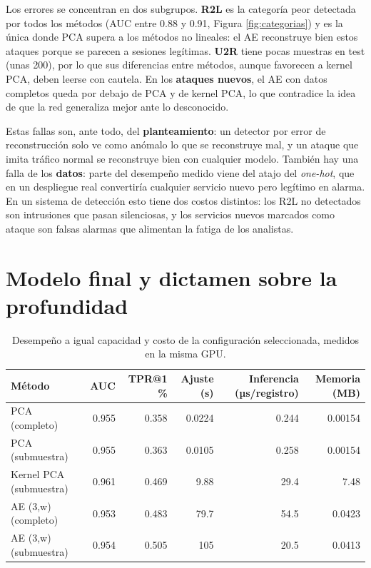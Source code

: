 \documentclass[
  11pt,
]{article}
\begin{document}
Los errores se concentran en dos subgrupos. \textbf{R2L} es la categoría peor detectada por todos los métodos
(AUC entre 0.88 y 0.91, Figura \ref{fig:categorias}) y es la única donde PCA supera a los métodos no
lineales: el AE reconstruye bien estos ataques porque se parecen a sesiones legítimas. \textbf{U2R} tiene pocas
muestras en test (unas 200), por lo que sus diferencias entre métodos, aunque favorecen a kernel PCA,
deben leerse con cautela. En los \textbf{ataques nuevos}, el AE con datos completos queda por debajo de PCA y
de kernel PCA, lo que contradice la idea de que la red generaliza mejor ante lo desconocido.

Estas fallas son, ante todo, del \textbf{planteamiento}: un detector por error de reconstrucción solo ve como
anómalo lo que se reconstruye mal, y un ataque que imita tráfico normal se reconstruye bien con
cualquier modelo. También hay una falla de los \textbf{datos}: parte del desempeño medido viene del atajo del
\emph{one-hot}, que en un despliegue real convertiría cualquier servicio nuevo pero legítimo en alarma. En un
sistema de detección esto tiene dos costos distintos: los R2L no detectados son intrusiones que pasan
silenciosas, y los servicios nuevos marcados como ataque son falsas alarmas que alimentan la fatiga de
los analistas.

\hypertarget{sec:dictamen}{%
\section{Modelo final y dictamen sobre la profundidad}\label{sec:dictamen}}

\begin{table}[!h]
\centering
\caption{\label{tab:costo}Desempeño a igual capacidad y costo de la configuración seleccionada, medidos en la misma GPU.}
\centering
\fontsize{8}{10}\selectfont
\begin{tabular}[t]{lrrrrr}
\toprule
Método & AUC & TPR@1 \% & Ajuste (s) & Inferencia (µs/registro) & Memoria (MB)\\
\midrule
PCA (completo) & 0.955 & 0.358 & 0.0224 & 0.244 & 0.00154\\
PCA (submuestra) & 0.955 & 0.363 & 0.0105 & 0.258 & 0.00154\\
Kernel PCA (submuestra) & 0.961 & 0.469 & 9.88 & 29.4 & 7.48\\
AE (3,w) (completo) & 0.953 & 0.483 & 79.7 & 54.5 & 0.0423\\
AE (3,w) (submuestra) & 0.954 & 0.505 & 105 & 20.5 & 0.0413\\
\bottomrule
\end{tabular}
\end{table}
\end{document}
